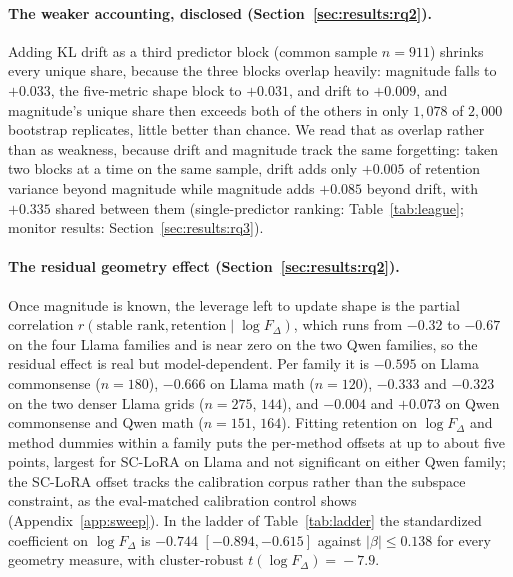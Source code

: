 \documentclass[11pt]{article}
\newcommand{\dw}{F_{\Delta}}
\begin{document}
\paragraph{The weaker accounting, disclosed
(Section~\ref{sec:results:rq2}).} Adding KL drift as a third predictor block
(common sample $n\!=\!911$) shrinks every unique share, because the three
blocks overlap heavily: magnitude falls to $+0.033$, the five-metric shape
block to $+0.031$, and drift to $+0.009$, and magnitude's unique share then
exceeds both of the others in only $1{,}078$ of $2{,}000$ bootstrap
replicates, little better than chance. We read that as overlap rather than as
weakness, because drift and magnitude track the same forgetting: taken two
blocks at a time on the same sample, drift adds only $+0.005$ of retention
variance beyond magnitude while magnitude adds $+0.085$ beyond drift, with
$+0.335$ shared between them (single-predictor ranking:
Table~\ref{tab:league}; monitor results: Section~\ref{sec:results:rq3}).

\paragraph{The residual geometry effect
(Section~\ref{sec:results:rq2}).} Once magnitude is known, the leverage left
to update shape is the partial correlation $r(\text{stable rank},
\text{retention} \mid \log\dw)$, which runs from $-0.32$ to $-0.67$ on the
four Llama families and is near zero on the two Qwen families, so the residual
effect is real but model-dependent. Per family it is $-0.595$ on Llama
commonsense ($n\!=\!180$), $-0.666$ on Llama math ($n\!=\!120$), $-0.333$
and $-0.323$ on the two denser Llama grids ($n\!=\!275$, $144$), and
$-0.004$ and $+0.073$ on Qwen commonsense and Qwen math ($n\!=\!151$,
$164$). Fitting retention on $\log\dw$ and method dummies within a family
puts the per-method offsets at up to about five points, largest for SC-LoRA on
Llama and not significant on either Qwen family; the SC-LoRA offset tracks
the calibration corpus rather than the subspace constraint, as the
eval-matched calibration control shows (Appendix~\ref{app:sweep}). In the ladder
of Table~\ref{tab:ladder} the standardized coefficient on $\log\dw$ is
$-0.744$ $[-0.894, -0.615]$ against $|\beta|\!\le\!0.138$ for every
geometry measure, with cluster-robust $t(\log\dw)\!=\!-7.9$.
\end{document}
